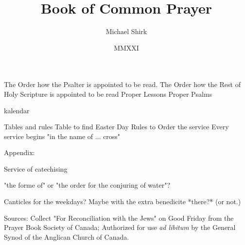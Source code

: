 \documentclass[foolscapvopaper,10pt,twoside,openany,extrafontsizes,final]{memoir}
\begin{document}
\frontmatter
\title{Book of Common Prayer}
\author{Michael Shirk}
\date{MMXXI}




\tableofcontents*


The Order how the Psalter is appointed to be read.
The Order how the Rest of Holy Scripture is appointed to be read
Proper Lessons
Proper Psalms


kalendar

Tables and rules
Table to find Easter Day
Rules to Order the service
  Every service begins "in the name of ... cross"

\mainmatter
























% 




Appendix:

Service of catechising

"the forme of" or "the order for the conjuring of water"?


Canticles for the weekdays? Maybe with the extra benedicite *there?* (or not.)

Sources:
Collect "For Reconciliation with the Jews" on Good Friday from the Prayer Book Society of Canada; Authorized for use \emph{ad libitum} by the General Synod of the Anglican Church of Canada.
\end{document}
